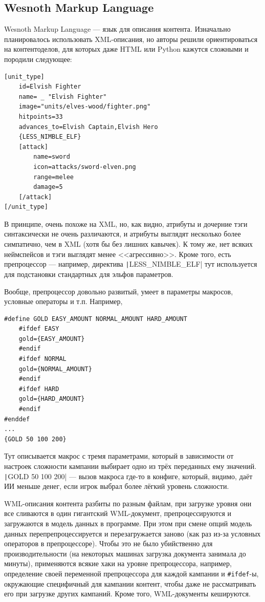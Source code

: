 \documentclass{../text-style}
\begin{document}
\subsection{Wesnoth Markup Language}

Wesnoth Markup Language --- язык для описания контента. Изначально планировалось использовать XML-описания, но авторы решили ориентироваться на контентоделов, для которых даже HTML или Python кажутся сложными и породили следующее:

\begin{verbatim}
[unit_type]
    id=Elvish Fighter
    name= _ "Elvish Fighter"
    image="units/elves-wood/fighter.png"
    hitpoints=33
    advances_to=Elvish Captain,Elvish Hero
    {LESS_NIMBLE_ELF}
    [attack]
        name=sword
        icon=attacks/sword-elven.png
        range=melee
        damage=5
    [/attack]
[/unit_type]
\end{verbatim}

В принципе, очень похоже на XML, но, как видно, атрибуты и дочерние тэги синтаксически не очень различаются, и атрибуты выглядят несколько более симпатично, чем в XML (хотя бы без лишних кавычек). К тому же, нет всяких неймспейсов и тэги выглядят менее <<агрессивно>>. Кроме того, есть препроцессор --- например, директива \texttt|{LESS_NIMBLE_ELF}| тут используется для подстановки стандартных для эльфов параметров.

Вообще, препроцессор довольно развитый, умеет в параметры макросов, условные операторы и т.п. Например,

\begin{verbatim}
#define GOLD EASY_AMOUNT NORMAL_AMOUNT HARD_AMOUNT
    #ifdef EASY
    gold={EASY_AMOUNT}
    #endif
    #ifdef NORMAL
    gold={NORMAL_AMOUNT}
    #endif
    #ifdef HARD
    gold={HARD_AMOUNT}
    #endif
#enddef
...
{GOLD 50 100 200}
\end{verbatim}

Тут описывается макрос с тремя параметрами, который в зависимости от настроек сложности кампании выбирает одно из трёх переданных ему значений. \texttt|{GOLD 50 100 200}| --- вызов макроса где-то в конфиге, который, видимо, даёт ИИ меньше денег, если игрок выбрал более лёгкий уровень сложности.

WML-описания контента разбиты по разным файлам, при загрузке уровня они все сливаются в один гигантский WML-документ, препроцессируются и загружаются в модель данных в программе. При этом при смене опций модель данных перепрепроцессируется и перезагружается заново (как раз из-за условных операторов в препроцессоре). Чтобы это не было убийственно для производительности (на некоторых машинах загрузка документа занимала до минуты), применяются всякие хаки на уровне препроцессора, например, определение своей переменной препроцессора для каждой кампании и \texttt{#ifdef}-ы, окружающие специфичный для кампании контент, чтобы даже не рассматривать его при загрузке других кампаний. Кроме того, WML-документы кешируются.
\end{document}
